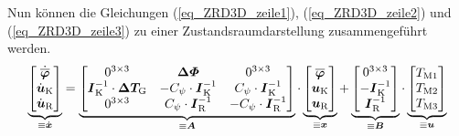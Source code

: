 Nun können die Gleichungen (\ref{eq_ZRD3D_zeile1}), (\ref{eq_ZRD3D_zeile2}) und (\ref{eq_ZRD3D_zeile3}) zu einer Zustandsraumdarstellung zusammengeführt werden.
\begin{equation}
\underbrace{\begin{bmatrix} \dot{\boldsymbol{\overline{\varphi}}} \\ \dot{\boldsymbol{u}}_{\text{K}} \\ \dot{\boldsymbol{u}}_{\text{R}} \end{bmatrix}}_{\equiv \dot{\boldsymbol{x}}} 
= 
\underbrace{\begin{bmatrix}
0^{3\times 3} & \boldsymbol{\Delta\varPhi} & 0^{3\times 3} \\
\boldsymbol{I}^{-1}_{\text{K}} \cdot \boldsymbol{\Delta T_{\text{G}}} & -C_{\psi}\cdot \boldsymbol{I}^{-1}_{\text{K}} & C_{\psi}\cdot \boldsymbol{I}^{-1}_{\text{K}} \\
0^{3\times 3} & C_{\psi}\cdot \boldsymbol{I}^{-1}_{\text{R}} & -C_{\psi}\cdot \boldsymbol{I}^{-1}_{\text{R}}
\end{bmatrix}}_{\equiv \boldsymbol{A}}
\cdot
\underbrace{\begin{bmatrix}\boldsymbol{\overline{\varphi}} \\ \boldsymbol{u}_{\text{K}} \\ \boldsymbol{u}_{\text{R}}\end{bmatrix}}_{\equiv \boldsymbol{x}}
+
\underbrace{\begin{bmatrix}
0^{3\times 3} \\ -\boldsymbol{I}^{-1}_{\text{K}} \\ \boldsymbol{I}^{-1}_{\text{R}}
\end{bmatrix}}_{\equiv \boldsymbol{B}}
\cdot
\underbrace{\begin{bmatrix}
T_{\text{M1}} \\ T_{\text{M2}} \\ T_{\text{M3}}
\end{bmatrix}}_{\equiv \boldsymbol{u}}
\end{equation}